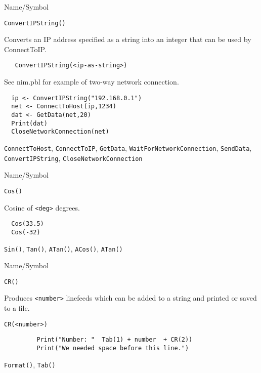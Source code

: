 \rl



\begin{desc}{Name/Symbol}
\item[Name/Symbol] \verb+ConvertIPString()+

\item[Description]	Converts an IP address specified as a string into
  an integer that can be used by ConnectToIP.

\item[Usage]
\begin{verbatim}
   ConvertIPString(<ip-as-string>)
\end{verbatim}

\item[Example]	

  See nim.pbl for example of two-way network connection.
\begin{verbatim}
  ip <- ConvertIPString("192.168.0.1")
  net <- ConnectToHost(ip,1234)
  dat <- GetData(net,20)
  Print(dat)
  CloseNetworkConnection(net)
\end{verbatim}

\item[See Also]
  \verb+ConnectToHost+, \verb+ConnectToIP+, \verb+GetData+, \verb+WaitForNetworkConnection+,
   \verb+SendData+, \verb+ConvertIPString+, \verb+CloseNetworkConnection+
\end{desc}

\rl


\begin{desc}{Name/Symbol}
\item[Name/Symbol]  	\verb+Cos()+
			 
\item[Description] 	Cosine of \verb+<deg>+ degrees.

\item[Usage]		
\item[Example]	
\begin{verbatim}
  Cos(33.5)
  Cos(-32)
\end{verbatim}

\item[See Also]     	\verb+Sin()+, \verb+Tan()+, \verb+ATan()+, \verb+ACos()+, \verb+ATan()+
\end{desc}

\rl     


\begin{desc}{Name/Symbol}

\item[Name/Symbol] \verb+CR()+

\item[Description]  Produces \verb+<number>+ linefeeds which can be added to a
  string and printed or saved to a file.

\item[Usage]        \verb!CR(<number>)!

\item[Example]     
\begin{verbatim}
         Print("Number: "  Tab(1) + number  + CR(2))
         Print("We needed space before this line.")
\end{verbatim}
\item[See Also]
\verb+Format()+, \verb+Tab()+
\end{desc}


